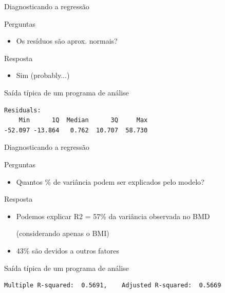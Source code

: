 \documentclass{beamer}
\begin{document}
\begin{frame}[fragile]{Diagnosticando a regressão}
  \begin{block}{Perguntas}
    \begin{itemize}
      \footnotesize
    \item Os resíduos são aprox. normais?
    \end{itemize}
  \end{block}
  \bigskip
  \begin{exampleblock}{Resposta}
    \begin{itemize}
    \item Sim \hfill \footnotesize (probably...)
    \end{itemize}
  \end{exampleblock}
  \vfill
  \begin{exampleblock}{Saída típica de um programa de análise}
    \scriptsize
\begin{verbatim}
Residuals:
    Min      1Q  Median      3Q     Max 
-52.097 -13.864   0.762  10.707  58.730 
\end{verbatim}
\end{exampleblock}
\end{frame}

\begin{frame}[fragile]{Diagnosticando a regressão}
  \begin{block}{Perguntas}
    \begin{itemize}
      \footnotesize
    \item Quantos \% de variância podem ser explicados pelo modelo?
    \end{itemize}
  \end{block}
  \bigskip
  \begin{exampleblock}{Resposta}
    \begin{itemize}
      \footnotesize 
    \item Podemos explicar R2 = 57\% da variância observada no BMD

      \scriptsize(considerando \alert{apenas} o BMI)
      \bigskip
    \item \scriptsize 43\% são devidos a outros fatores
    \end{itemize}
  \end{exampleblock}
  \vfill
  \begin{exampleblock}{Saída típica de um programa de análise}
    \scriptsize
\begin{verbatim}
Multiple R-squared:  0.5691,	Adjusted R-squared:  0.5669 
\end{verbatim}
\end{exampleblock}
\end{frame}
\end{document}
